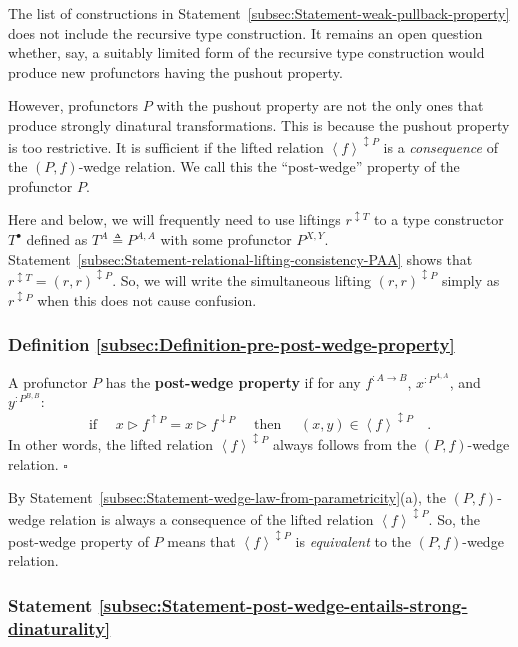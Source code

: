 The list of constructions in Statement~\ref{subsec:Statement-weak-pullback-property}
does not include the recursive type construction. It remains an open
question whether, say, a suitably limited form of the recursive type
construction would produce new profunctors having the pushout property.

However, profunctors $P$ with the pushout property are not the only
ones that produce strongly dinatural transformations. This is because
the pushout property is too restrictive. It is sufficient if the lifted
relation $\left<f\right>^{\updownarrow P}$ is a \emph{consequence}
of the $\left(P,f\right)$-wedge relation. We call this the \textsf{``}post-wedge\textsf{''}
property of the profunctor
$P$.

Here and below, we will frequently need to use liftings $r^{\updownarrow T}$
to a type constructor $T^{\bullet}$ defined as $T^{A}\triangleq P^{A,A}$
with some profunctor $P^{X,Y}$. Statement~\ref{subsec:Statement-relational-lifting-consistency-PAA}
shows that $r^{\updownarrow T}=(r,r)^{\updownarrow P}$. So, we will
write the simultaneous lifting $(r,r)^{\updownarrow P}$ simply as
$r^{\updownarrow P}$ when this does not cause confusion.

\subsubsection{Definition \label{subsec:Definition-pre-post-wedge-property}\ref{subsec:Definition-pre-post-wedge-property}}

A profunctor $P$ has the \textbf{post-wedge property} if for any
$f^{:A\rightarrow B}$, $x^{:P^{A,A}}$, and $y^{:P^{B,B}}$:
\[
\text{if }\quad x\triangleright f^{\uparrow P}=x\triangleright f^{\downarrow P}\quad\text{ then }\quad(x,y)\in\left<f\right>^{\updownarrow P}\quad.
\]
In other words, the lifted relation $\left<f\right>^{\updownarrow P}$
always follows from the $\left(P,f\right)$-wedge relation. $\square$

By Statement~\ref{subsec:Statement-wedge-law-from-parametricity}(a),
the $\left(P,f\right)$-wedge relation is always a consequence of
the lifted relation $\left<f\right>^{\updownarrow P}$. So, the post-wedge
property of $P$ means that $\left<f\right>^{\updownarrow P}$ is
\emph{equivalent} to the $\left(P,f\right)$-wedge relation.

\subsubsection{Statement \label{subsec:Statement-post-wedge-entails-strong-dinaturality}\ref{subsec:Statement-post-wedge-entails-strong-dinaturality}}

